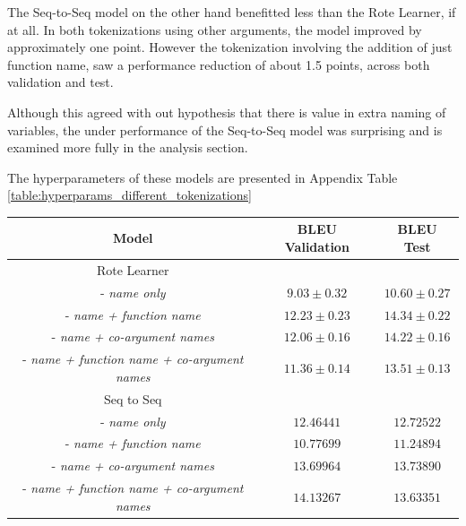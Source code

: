 The Seq-to-Seq model on the other hand benefitted less than the Rote Learner, if at all. In both tokenizations using other arguments, the model improved by approximately one point. However the tokenization involving the addition of just function name, saw a performance reduction of about 1.5 points, across both validation and test.

Although this agreed with out hypothesis that there is value in extra naming of variables, the under performance of the Seq-to-Seq model was surprising and is examined more fully in the analysis section.


The hyperparameters of these models are presented in Appendix Table \ref{table:hyperparams_different_tokenizations}


\begin{table}[!ht]
\begin{center}
\begin{tabular}{ c | c | c }
    Model                               & BLEU Validation            & BLEU Test  \\
    \hline
    \hline
    Rote Learner                        &                  & \\    
    - \textit{name only}                & $ 9.03  \pm  0.32 $ & $ 10.60 \pm 0.27 $  \\
    - \textit{name + function name}     & $ 12.23 \pm  0.23 $ & $ 14.34 \pm 0.22 $  \\
    - \textit{name + co-argument names}        & $ 12.06 \pm  0.16 $ & $ 14.22 \pm 0.16 $  \\
    - \textit{name + function name + co-argument names}  & $ 11.36 \pm  0.14 $ & $ 13.51 \pm 0.13 $ \\
    \hline
    \hline
    Seq to Seq                          &                  & \\
    - \textit{name only}                & $ 12.46441 $ & $ 12.72522 $  \\
    - \textit{name + function name}     & $ 10.77699 $ & $ 11.24894 $ \\
    - \textit{name + co-argument names}      & $ 13.69964 $ & $ 13.73890 $  \\
    - \textit{name + function name + co-argument names} & $ 14.13267 $ & $ 13.63351 $ \\

\end{tabular}
\end{center}
\end{table}
